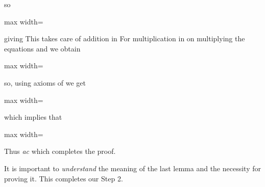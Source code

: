 \documentclass[11pt,oneside]{article}
\begin{document}
\begin{BookBody}
\noindent so

\begin{center}\begin{adjustbox}{max width=\linewidth}\end{adjustbox}\end{center}

\noindent giving  This takes care of addition in  For multiplication in  on multiplying the equations  and  we obtain

\begin{center}\begin{adjustbox}{max width=\linewidth}\end{adjustbox}\end{center}

\noindent so, using axioms of  we get

\begin{center}\begin{adjustbox}{max width=\linewidth}\end{adjustbox}\end{center}

\noindent which implies that

\begin{center}\begin{adjustbox}{max width=\linewidth}\end{adjustbox}\end{center}

\noindent Thus \BookInline{(a_{1}c_{1},\allowbreak b_{1}d_{1})\in [(}\textit{ac}\BookInline{,\allowbreak bd)],\allowbreak } which completes the proof. \BookEnd{\blacklozenge}

It is important to\textit{ understand} the meaning of the last lemma and the necessity for proving it. This completes our Step 2.

\end{BookBody}

\BookNarrativetrue
\end{document}
